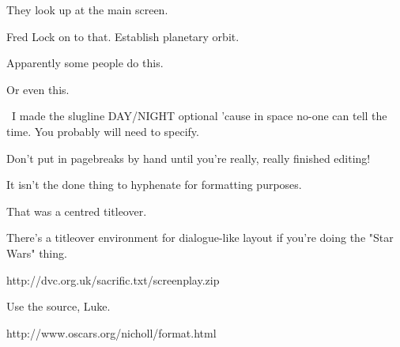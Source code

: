 \documentclass{article}
\begin{document}
\begin{screenplay}
They look up at the main screen.

\begin{dialogue}{Fred}
Lock on to that.
Establish planetary orbit.
\end{dialogue}

Apparently some people do this.

\intercut
{}
Or even this.


\pov\ I made the slugline DAY/NIGHT optional 'cause in space no-one can
tell the time.  You probably will need to specify.

Don't put in pagebreaks by hand until you're really, really
finished editing!

It isn't the done thing to hyphenate for formatting purposes.

That was a centred titleover.
\begin{titleover}There's a titleover environment for dialogue-like layout if you're
doing the "Star Wars" thing.\end{titleover}
http://dvc.org.uk/sacrific.txt/screenplay.zip

Use the source, Luke.


http://www.oscars.org/nicholl/format.html

\fadeout

\theend
\end{screenplay}
\end{document}
